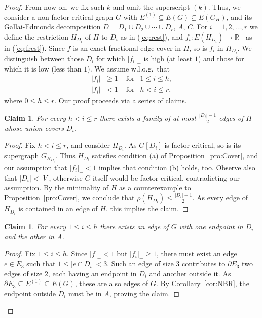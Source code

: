 \documentclass[10pt,a4paper]{amsart}
\newtheorem{claim}[theorem]{Claim}
\begin{document}
\begin{proof}
From now on, we fix such $k$ and omit the superscript $(k)$. Thus, we consider a non-factor-critical graph $G$ with $E^{(1)} \subseteq E(G) \subsetneq E(G_H)$, and its Gallai-Edmonds decomposition $D = D_1 \cup D_2 \cup \cdots \cup D_r$, $A$, $C$. For $i=1,2, \ldots , r$ we define the restriction $H_{D_i}$ of $H$ to $D_i$ as in (\ref{eq:rest}), and $f_i: E(H_{D_i}) \to \mathbb{R}_+$ as in (\ref{eq:frest}). Since $f$ is an exact fractional edge cover in $H$, so is $f_i$ in $H_{D_i}$. We distinguish between those $D_i$ for which $|f_i|_-$ is high (at least $1$) and those for which it is low (less than $1$). We assume w.l.o.g.\ that
\begin{eqnarray*}
|f_i|_-  \ge 1\,\, & \textrm{for} & 1 \le i \le h, \\
|f_i|_-  < 1\,\, & \textrm{for} & h < i \le r,
\end{eqnarray*}
where $0 \le h \le r$.
Our proof proceeds via a series of claims.
\begin{claim} \label{cl:Low}
For every $h < i \le r$ there exists a family of at most $\frac{|D_i|-1}{2}$ edges of $H$ whose union covers $D_i$.
\end{claim}
\begin{proof} Fix $h < i \le r$, and consider $H_{D_i}$. As $G[D_i]$ is factor-critical, so is its supergraph $G_{H_{D_i}}$. Thus $H_{D_i}$ satisfies condition (a) of Proposition~\ref{pro:Cover}, and our assumption that $|f_i|_- < 1$ implies that condition (b) holds, too. Observe also that $|D_i| < |V|$, otherwise $G$ itself would be factor-critical, contradicting our assumption. By the minimality of $H$ as a counterexample to Proposition~\ref{pro:Cover}, we conclude that $\rho(H_{D_i}) \le \frac{|D_i|-1}{2}$. As every edge of $H_{D_i}$ is contained in an edge of $H$, this implies the claim.
\end{proof}
\begin{claim} \label{cl:Edge}
For every $1 \le i \le h$ there exists an edge of $G$ with one endpoint in $D_i$ and the other in $A$.
\end{claim}
\begin{proof} Fix $1 \le i \le h$. Since $|f|_- < 1$ but $|f_i|_- \ge 1$, there must exist an edge $e \in E_3$ such that $1 \le |e \cap D_i| < 3$. Such an edge of size $3$ contributes to $\partial E_3$ two edges of size $2$, each having an endpoint in $D_i$ and another outside it. As $\partial E_3 \subseteq E^{(1)} \subseteq E(G)$, these are also edges of $G$. By Corollary~\ref{cor:NBR}, the endpoint outside $D_i$ must be in $A$, proving the claim.

\end{proof}
\end{proof}
\end{document}
